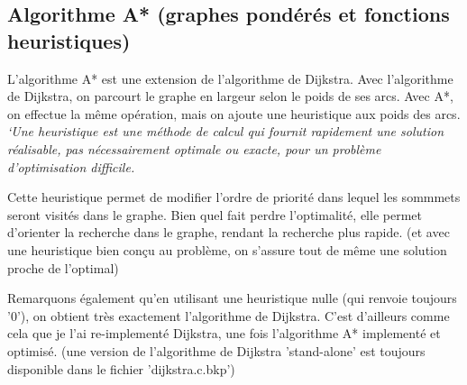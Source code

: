 \documentclass[a4paper,10pt]{article}
\begin{document}
      \subsection{Algorithme A* (graphes pondérés et fonctions heuristiques)}
    L'algorithme A* est une extension de l'algorithme de Dijkstra.\newline
    Avec l'algorithme de Dijkstra, on parcourt le graphe en largeur selon le poids de ses arcs.
    Avec A*, on effectue la même opération, mais on ajoute une heuristique aux poids des arcs.
    \textit{`Une heuristique est une méthode de calcul qui fournit rapidement une solution réalisable,
    pas nécessairement optimale ou exacte, pour un problème d'optimisation difficile.} \cite{heuristique}\newline
    
    Cette heuristique permet de modifier l'ordre de priorité dans lequel les sommmets seront visités dans le graphe.
    Bien quel fait perdre l'optimalité, elle permet d'orienter la recherche dans le graphe, rendant la recherche plus rapide.
    (et avec une heuristique bien conçu au problème, on s'assure tout de même une solution proche de l'optimal)\newline
    
    Remarquons également qu'en utilisant une heuristique nulle (qui renvoie toujours '0'), on obtient très exactement l'algorithme de Dijkstra.
    C'est d'ailleurs comme cela que je l'ai re-implementé Dijkstra, une fois l'algorithme A* implementé et optimisé.
    (une version de l'algorithme de Dijkstra 'stand-alone' est toujours disponible dans le fichier 'dijkstra.c.bkp')
    
\end{document}
